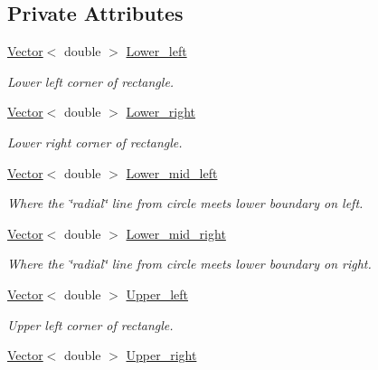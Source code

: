 \subsection*{Private Attributes}
\begin{DoxyCompactItemize}
\item 
\hyperlink{classoomph_1_1Vector}{Vector}$<$ double $>$ \hyperlink{classoomph_1_1RectangleWithHoleDomain_a6926164244a3726aa904023c014e2cf0}{Lower\+\_\+left}
\begin{DoxyCompactList}\small\item\em Lower left corner of rectangle. \end{DoxyCompactList}\item 
\hyperlink{classoomph_1_1Vector}{Vector}$<$ double $>$ \hyperlink{classoomph_1_1RectangleWithHoleDomain_ab71febd980c61d0c2ba0a76eca053a97}{Lower\+\_\+right}
\begin{DoxyCompactList}\small\item\em Lower right corner of rectangle. \end{DoxyCompactList}\item 
\hyperlink{classoomph_1_1Vector}{Vector}$<$ double $>$ \hyperlink{classoomph_1_1RectangleWithHoleDomain_aa643600f8269e6037a76832dd0fba0f9}{Lower\+\_\+mid\+\_\+left}
\begin{DoxyCompactList}\small\item\em Where the \char`\"{}radial\char`\"{} line from circle meets lower boundary on left. \end{DoxyCompactList}\item 
\hyperlink{classoomph_1_1Vector}{Vector}$<$ double $>$ \hyperlink{classoomph_1_1RectangleWithHoleDomain_a9ef86489e71e2f67eec783b460694be2}{Lower\+\_\+mid\+\_\+right}
\begin{DoxyCompactList}\small\item\em Where the \char`\"{}radial\char`\"{} line from circle meets lower boundary on right. \end{DoxyCompactList}\item 
\hyperlink{classoomph_1_1Vector}{Vector}$<$ double $>$ \hyperlink{classoomph_1_1RectangleWithHoleDomain_a0e5a29a907836dace560edd72a70917d}{Upper\+\_\+left}
\begin{DoxyCompactList}\small\item\em Upper left corner of rectangle. \end{DoxyCompactList}\item 
\hyperlink{classoomph_1_1Vector}{Vector}$<$ double $>$ \hyperlink{classoomph_1_1RectangleWithHoleDomain_a3bc6d59a004c8fe1b634b43b6665c9b9}{Upper\+\_\+right}

\end{DoxyCompactItemize}
